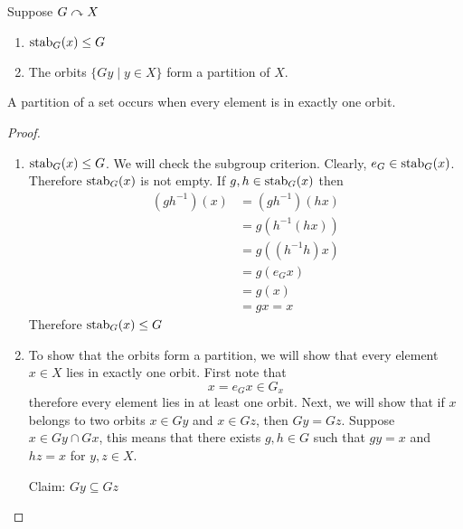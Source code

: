 \documentclass{article}
\begin{document}
\begin{prop}
    Suppose $G \curvearrowright X$
    \begin{enumerate}
        \item $\operatorname{stab}_G(x) \leq G$
        \item The orbits $\{Gy \mid y \in X\}$ form a partition of $X$.
    \end{enumerate}
\end{prop}


\begin{defi}[Partition]
    A partition of a set occurs when every element is in exactly one orbit.
\end{defi}

\begin{proof}\leavevmode
    \begin{enumerate}
        \item $\operatorname{stab}_G(x) \leq G$. We will check the subgroup criterion. Clearly, $e_G \in \operatorname{stab}_G(x)$. Therefore $\operatorname{stab}_G(x)$ is not empty. If $g, h \in \operatorname{stab}_G(x)$ then
        \begin{align*}
            (g h^{-1})(x) &= (g h^{-1})(h x) \tag{since $hx = x$} \\
            &= g (h^{-1} (h x)) \\
            &= g ((h^{-1}h) x) \\
            &= g (e_G x) \\
            &= g (x) \tag{By group action property} \\
            &= gx = x
        \end{align*}
        Therefore $\operatorname{stab}_G(x) \leq G$
        \item To show that the orbits form a partition, we will show that every element $x \in X$ lies in exactly one orbit. First note that
        \[
            x = e_Gx \in G_x  
        \]
        therefore every element lies in at least one orbit. Next, we will show that if $x$ belongs to two orbits $x \in Gy$ and $x \in Gz$, then $Gy = Gz$. Suppose $x \in Gy \cap Gx$,
        this means that there exists $g, h \in G$ such that $gy = x$ and $hz = x$ for $y, z \in X$.
        
        Claim: $Gy \subseteq Gz$


\end{enumerate}
\end{proof}
\end{document}
